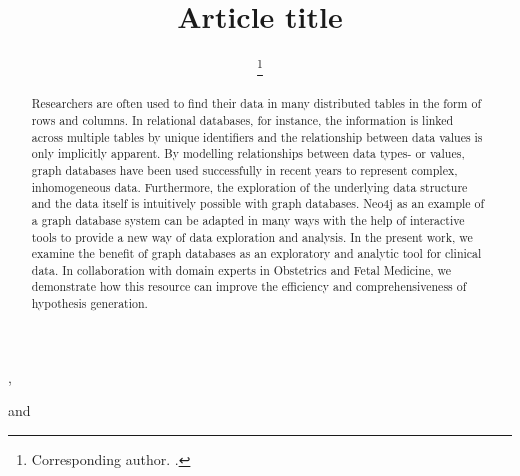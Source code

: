 \documentclass[aac]{iosart2x}
\begin{document}
\begin{frontmatter}

\title{Article title}


\author[A]{ %
\thanks{Corresponding author. .}},
\author[B]{ }
and
\author[B]{ }
\address[A]{Department first, ,
Abbreviate US states, }
\address[B]{Department first, ,
Abbreviate US states, }

\begin{abstract}
Researchers are often used to find their data in many distributed tables in the form of rows and columns. In relational databases, for instance, the information is linked across multiple tables by unique identifiers and the relationship between data values is only implicitly apparent. By modelling relationships between data types- or values, graph databases have been used successfully in recent years to represent complex, inhomogeneous data. Furthermore, the exploration of the underlying data structure and the data itself is intuitively possible with graph databases. Neo4j as an example of a graph database system can be adapted in many ways with the help of interactive tools to provide a new way of data exploration and analysis. In the present work, we examine the benefit of graph databases as an exploratory and analytic tool for clinical data. In collaboration with domain experts in Obstetrics and Fetal Medicine, we demonstrate how this resource can improve the efficiency and comprehensiveness of hypothesis generation.
\end{abstract}

\begin{keyword}
\end{keyword}

\end{frontmatter}
\end{document}
